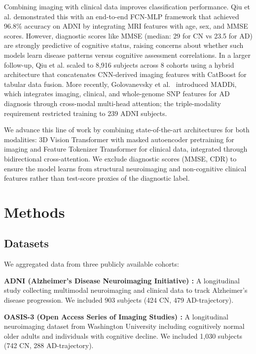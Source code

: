 \documentclass[conference]{IEEEtran}
\begin{document}
Combining imaging with clinical data improves classification performance. Qiu et al. \cite{qiu2020} demonstrated this with an end-to-end FCN-MLP framework that achieved 96.8\% accuracy on ADNI by integrating MRI features with age, sex, and MMSE scores. However, diagnostic scores like MMSE (median: 29 for CN vs 23.5 for AD) are strongly predictive of cognitive status, raising concerns about whether such models learn disease patterns versus cognitive assessment correlations. In a larger follow-up, Qiu et al. \cite{qiu2022} scaled to 8,916 subjects across 8 cohorts using a hybrid architecture that concatenates CNN-derived imaging features with CatBoost for tabular data fusion. More recently, Golovanevsky et al.~\cite{maddi2022} introduced MADDi, which integrates imaging, clinical, and whole-genome SNP features for AD diagnosis through cross-modal multi-head attention; the triple-modality requirement restricted training to 239 ADNI subjects.

We advance this line of work by combining state-of-the-art architectures for both modalities: 3D Vision Transformer with masked autoencoder pretraining for imaging and Feature Tokenizer Transformer for clinical data, integrated through bidirectional cross-attention. We exclude diagnostic scores (MMSE, CDR) to ensure the model learns from structural neuroimaging and non-cognitive clinical features rather than test-score proxies of the diagnostic label.

\section{Methods}

\subsection{Datasets}

We aggregated data from three publicly available cohorts:

\textbf{ADNI (Alzheimer's Disease Neuroimaging Initiative) \cite{adni2005}:} A longitudinal study collecting multimodal neuroimaging and clinical data to track Alzheimer's disease progression. We included 903 subjects (424 CN, 479 AD-trajectory).

\textbf{OASIS-3 (Open Access Series of Imaging Studies) \cite{oasis3}:} A longitudinal neuroimaging dataset from Washington University including cognitively normal older adults and individuals with cognitive decline. We included 1,030 subjects (742 CN, 288 AD-trajectory).
\end{document}
